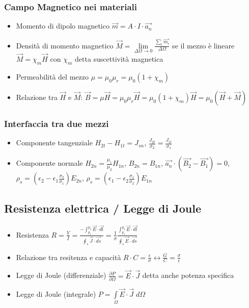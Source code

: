 \documentclass{article}
\begin{document}
\subsubsection{Campo Magnetico nei materiali}
\begin{itemize}
	\item Momento di dipolo magnetico \( \vec{m} = A \cdot I \cdot \vec{a_n} \)
	\item Densità di momento magnetico \(\vec{M} = \lim\limits_{\Delta\Omega \rightarrow 0} \frac{\sum_i \vec{m_i}}{\Delta\Omega}\) se il mezzo è lineare \( \vec{M} = \chi_m \vec{H} \) con \(\chi_m\) detta suscettività magnetica
	\item Permeabilità del mezzo \( \mu = \mu_0 \mu_r = \mu_0 (1 + \chi_m) \)
	\item Relazione tra \( \vec{H} \) e \( \vec{M} \): \( \vec{B} = \mu \vec{H} = \mu_0 \mu_r \vec{H} = \mu_0 (1 + \chi_m) \vec{H} = \mu_0 (\vec{H} + \vec{M}) \)
\end{itemize}



\subsubsection{Interfaccia tra due mezzi}
\begin{itemize}
	\item Componente tangenziale \( H_{2t} - H_{1t} = J_{sn} \), \( \frac{J_{2t}}{\sigma_2} = \frac{J_{1t}}{\sigma_1} \)
	\item Componente normale \( H_{2n} = \frac{\mu_1}{\mu_2} H_{1n} \), \(B_{2n} = B_{1n}\), \( \vec{a_n} \cdot (\vec{B_2} - \vec{B_1}) = 0 \), \( \rho_s = ( \epsilon_2 - \epsilon_1 \frac{\sigma_2}{\sigma_1}) E_{2n} \),  \( \rho_s = ( \epsilon_1 - \epsilon_2 \frac{\sigma_1}{\sigma_2}) E_{1n} \)
\end{itemize}

\subsection{Resistenza elettrica / Legge di Joule}
\begin{itemize}
	\item Resistenza \( R = \frac{V}{I} = \frac{-\int_{p_1}^{p_2} \vec{E} \cdot \vec{dl}}{\oint_s \vec{J} \cdot \vec{ds}} = \frac{1}{\sigma} \frac{\int_{p_1}^{p_2} \vec{E} \cdot \vec{dl}}{\oint_s \vec{E} \cdot \vec{ds}} \)
	\item Relazione tra resitenza e capacità \(R \cdot C = \frac{\epsilon}{\sigma} \leftrightarrow \frac{G}{C} = \frac{\sigma}{\epsilon} \)
	\item Legge di Joule (differenziale) \( \frac{\partial P}{\partial \Omega} = \vec{E} \cdot \vec{J} \) detta anche potenza specifica
	\item Legge di Joule (integrale) \( P = \int\limits_\Omega \vec{E} \cdot \vec{J} \; d\Omega \)
\end{itemize}
\end{document}
